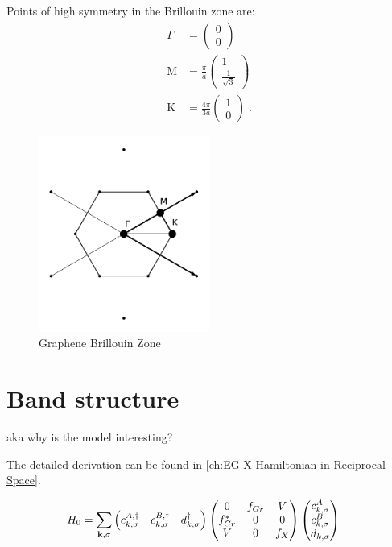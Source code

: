 \documentclass[../main.tex]{subfiles}
\begin{document}
Points of high symmetry in the Brillouin zone are:
\begin{align}
	\Gamma &= \begin{pmatrix} 0 \\ 0 \end{pmatrix} \\
	\mathrm{M} &= \frac{\pi}{a} \begin{pmatrix} 1 \\ \frac{1}{\sqrt{3}} \end{pmatrix} \\
	\mathrm{K} &= \frac{4\pi}{3 a} \begin{pmatrix} 1 \\ 0 \end{pmatrix}
	\;.
\end{align}

\begin{figure}[t]
	\centering
	\includegraphics[width=0.5\textwidth]{images/graphene brillouin_zone}
	\caption{Graphene Brillouin Zone}
	\label{fig:graphene Brillouin zone}
\end{figure}

\section{Band structure}

aka why is the model interesting?

The detailed derivation can be found in \cref{ch:EG-X Hamiltonian in Reciprocal Space}.

\begin{align}
	H_0 &= \sum_{\bm{\mathrm{k}}, \sigma} \begin{pmatrix} c_{k, \sigma}^{A, \dagger} & c_{k, \sigma}^{B, \dagger} & d_{k, \sigma}^{\dagger} \end{pmatrix}
	\begin{pmatrix}
		0 & f_{Gr} & V \\
		f_{Gr}^* & 0 & 0 \\
		V & 0 & f_{X}
	\end{pmatrix} \begin{pmatrix} c_{k, \sigma}^{A} \\ c_{k, \sigma}^{B} \\ d_{k, \sigma} \end{pmatrix}
	\label{eq:EG-X Hamiltonian non-interacting matrix}
\end{align}
	
	
\end{document}
